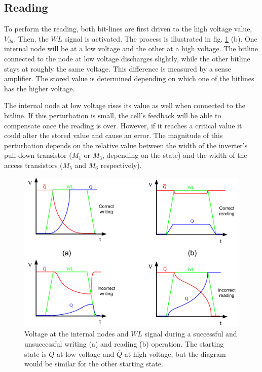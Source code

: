 \subsection*{Reading}

 To perform the reading, both bit-lines are first driven to the high voltage value, $V_{dd}$. Then, the $WL$ signal is activated. The process is illustrated in fig. \ref{fig:readwrite} (b). One internal node will be at a low voltage and the other at a high voltage. The bitline connected to the node at low voltage discharges slightly, while the other bitline stays at roughly the same voltage. This difference is measured by a sense amplifier. The stored value is determined depending on which one of the bitlines has the higher voltage. 

The internal node at low voltage rises its value as well when connected to the bitline. If this perturbation is small, the cell's feedback will be able to compensate once the reading is over. However, if it reaches a critical value it could alter the stored value and cause an error. The magnitude of this perturbation depends on the relative value between the width of the inverter's pull-down transistor ($M_1$ or $M_3$, depending on the state) and the width of the access transistors ($M_5$ and $M_6$ respectively). 

\begin{figure}[H]
    \centering
    \includegraphics[width=15cm]{images/SRAM Read_Write.pdf}
    \caption{Voltage at the internal nodes and $WL$ signal during a successful and unsuccessful writing (a) and reading (b) operation. The starting state is $Q$ at low voltage and $\overline{Q}$ at high voltage, but the diagram would be similar for the other starting state. }
    \label{fig:readwrite}
\end{figure}

